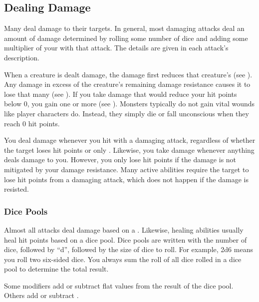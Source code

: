     \subsection{Dealing Damage}\label{Dealing Damage}
        Many  deal damage to their targets.
        In general, most damaging attacks deal an amount of damage determined by rolling some number of dice and adding some multiplier of your  with that attack.
        The details are given in each attack's description.

        When a creature is dealt damage, the damage first reduces that creature's  (see ).
        Any damage in excess of the creature's remaining damage resistance causes it to lose that many  (see ).
        If you take damage that would reduce your hit points below 0, you gain one or more  (see ).
        Monsters typically do not gain vital wounds like player characters do.
        Instead, they simply die or fall unconscious when they reach 0 hit points.

        You deal damage whenever you hit with a damaging attack, regardless of whether the target loses hit points or only .
        Likewise, you take damage whenever anything deals damage to you.
        However, you only lose hit points if the damage is not mitigated by your damage resistance.
        Many active abilities require the target to lose hit points from a damaging attack, which does not happen if the damage is resisted.

        \subsubsection{Dice Pools}\label{Dice Pools}
            Almost all attacks deal damage based on a .
            Likewise, healing abilities usually heal hit points based on a dice pool.
            Dice pools are written with the number of dice, followed by ``d'', followed by the size of dice to roll.
            For example, 2d6 means you roll two six-sided dice.
            You always sum the roll of all dice rolled in a dice pool to determine the total result.

            Some modifiers add or subtract flat values from the result of the dice pool.
            Others add or subtract .

